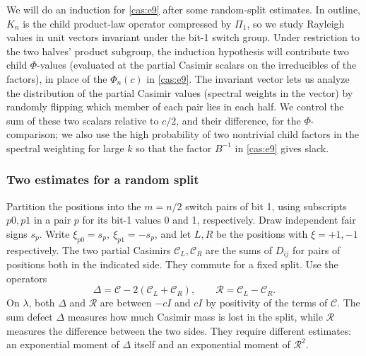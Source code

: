 We will do an induction for \eqref{cas:e9} after some random-split estimates. In outline, \(K_n\) is the child product-law operator compressed by \(\Pi_1\), so we study Rayleigh values in unit vectors invariant under the bit-1 switch group. Under restriction to the two halves' product subgroup, the induction hypothesis will contribute two child \(\Phi\)-values (evaluated at the partial Casimir scalars on the irreducibles of the factors), in place of the \(\Phi_n(c)\) in \eqref{cas:e9}. The invariant vector lets us analyze the distribution of the partial Casimir values (spectral weights in the vector) by randomly flipping which member of each pair lies in each half. We control the sum of these two scalars relative to \(c/2\), and their difference, for the \(\Phi\)-comparison; we also use the high probability of two nontrivial child factors in the spectral weighting for large \(k\) so that the factor \(B^{-1}\) in \eqref{cas:e9} gives slack.

\subsubsection{Two estimates for a random split}

Partition the positions into the \(m=n/2\) switch pairs of bit 1, using subscripts \(p0,p1\) in a pair \(p\) for its bit-1 values 0 and 1, respectively. Draw independent fair signs \(s_p\). Write \(\xi_{p0}=s_p,\ \xi_{p1}=-s_p\), and let \(L,R\) be the positions with \(\xi=+1,-1\) respectively. The two partial Casimirs \(\mathcal C_L,\mathcal C_R\) are the sums of \(D_{ij}\) for pairs of positions both in the indicated side. They commute for a fixed split. Use the operators
\[
\Delta=\mathcal C-2(\mathcal C_L+\mathcal C_R),\qquad
\mathcal R=\mathcal C_L-\mathcal C_R.
\]
On \(\lambda\), both \(\Delta\) and \(\mathcal R\) are between \(-cI\) and \(cI\) by positivity of the terms of \(\mathcal C\). The sum defect $\Delta$ measures how much Casimir mass is lost in the
split, while $\mathcal R$ measures the difference between the two sides.
They require different estimates: an exponential moment of $\Delta$
itself and an exponential moment of $\mathcal R^2$.


